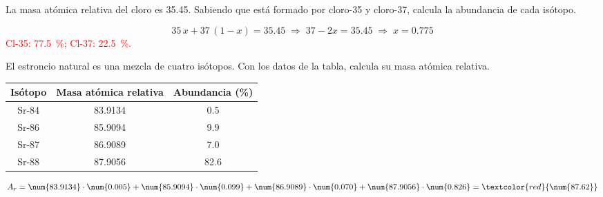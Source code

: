 \begin{exercise}
    La masa atómica relativa del cloro es \num{35.45}. Sabiendo que está formado por cloro-35 y cloro-37, calcula la abundancia de cada isótopo.
    \begin{solu}
        \[ 35\,x + 37\,(1 - x) = \num{35.45} \;\Rightarrow\; 37 - 2x = \num{35.45} \;\Rightarrow\; x = \num{0.775} \]
        \textcolor{red}{Cl-35: \qty{77.5}{\percent}; Cl-37: \qty{22.5}{\percent}.}
    \end{solu}
\end{exercise}

\begin{exercise}
    El estroncio natural es una mezcla de cuatro isótopos. Con los datos de la tabla, calcula su masa atómica relativa.
    \begin{center}
        \begin{tabular}{@{}ccc@{}}
            \toprule
            \textbf{Isótopo} & \textbf{Masa atómica relativa} & \textbf{Abundancia (\%)} \\
            \midrule
            Sr-84 & \num{83.9134} & \num{0.5} \\[3pt]
            Sr-86 & \num{85.9094} & \num{9.9} \\[3pt]
            Sr-87 & \num{86.9089} & \num{7.0} \\[3pt]
            Sr-88 & \num{87.9056} & \num{82.6} \\
            \bottomrule
        \end{tabular}
    \end{center}
    \begin{solu}
        \[ A_r = \num{83.9134}\cdot\num{0.005} + \num{85.9094}\cdot\num{0.099} + \num{86.9089}\cdot\num{0.070} + \num{87.9056}\cdot\num{0.826} = \textcolor{red}{\num{87.62}} \]
    \end{solu}
\end{exercise}

